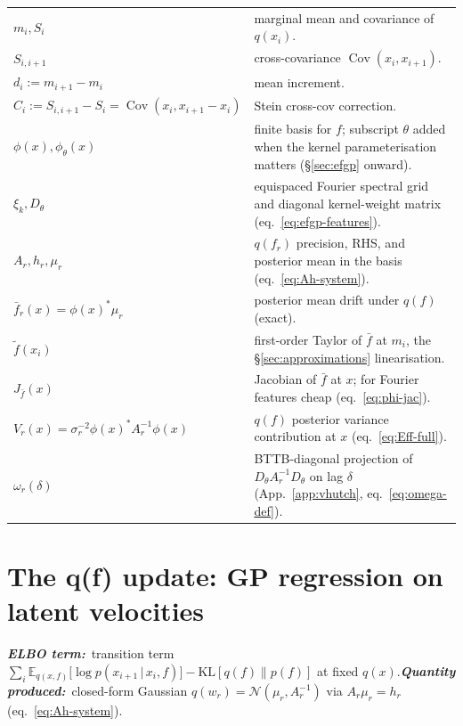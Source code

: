 \documentclass[11pt]{article}
\newcommand{\E}{\mathbb{E}}
\newcommand{\Cov}{\operatorname{Cov}}
\newcommand{\given}{\,|\,}
\newcommand{\elbobanner}[2]{%
\par\noindent\textbf{\textit{ELBO term:}}\ #1\quad\textbf{\textit{Quantity produced:}}\ #2\par\medskip}
\begin{document}
\noindent
\begin{tabular}{@{}p{} p{}@{}}
$m_i, S_i$ & marginal mean and covariance of $q(x_i)$. \\
$S_{i,i+1}$ & cross-covariance $\Cov(x_i, x_{i+1})$. \\
$d_i := m_{i+1}-m_i$ & mean increment. \\
$C_i := S_{i,i+1}-S_i = \Cov(x_i, x_{i+1}-x_i)$ & Stein cross-cov correction. \\
$\phi(x), \phi_\theta(x)$ & finite basis for $f$; subscript $\theta$ added
  when the kernel parameterisation matters (§\ref{sec:efgp} onward). \\
$\xi_k, D_\theta$ & equispaced Fourier spectral grid and diagonal
  kernel-weight matrix (eq.~\ref{eq:efgp-features}). \\
$A_r, h_r, \mu_r$ & $q(f_r)$ precision, RHS, and posterior mean in the
  basis (eq.~\ref{eq:Ah-system}). \\
$\bar f_r(x) = \phi(x)^*\mu_r$ & posterior mean drift under $q(f)$
  (exact). \\
$\widetilde f(x_i)$ & first-order Taylor of $\bar f$ at $m_i$, the
  §\ref{sec:approximations} linearisation. \\
$J_{\bar f}(x)$ & Jacobian of $\bar f$ at $x$; for Fourier features
  cheap (eq.~\ref{eq:phi-jac}). \\
$V_r(x) = \sigma_r^{-2}\phi(x)^* A_r^{-1}\phi(x)$ & $q(f)$ posterior
  variance contribution at $x$ (eq.~\ref{eq:Eff-full}). \\
$\omega_r(\delta)$ & BTTB-diagonal projection of $D_\theta A_r^{-1}
  D_\theta$ on lag $\delta$ (App.~\ref{app:vhutch}, eq.~\ref{eq:omega-def}). \\
\end{tabular}

\section{The q(f) update: GP regression on latent velocities}
\label{sec:qf-update}

\elbobanner{transition term $\sum_i \E_{q(x,f)}\!\bigl[\log p(x_{i+1}\given x_i,f)\bigr] -
\mathrm{KL}[q(f)\|p(f)]$ at fixed $q(x)$.}{closed-form Gaussian
$q(w_r)=\mathcal{N}(\mu_r, A_r^{-1})$ via $A_r\mu_r = h_r$
(eq.~\ref{eq:Ah-system}).}

\end{document}
